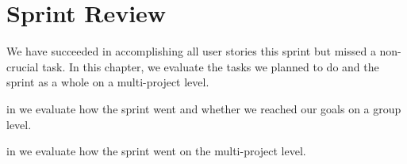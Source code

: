 \chapter{Sprint Review}\label{chap:sprint3_end}
We have succeeded in accomplishing all user stories this sprint but missed a non-crucial task. In this chapter, we evaluate the tasks we planned to do and the sprint as a whole on a multi-project level.

\begin{chapterorganization}
  \item in  we evaluate how the sprint went and whether we reached our goals on a group level.
  \item in  we evaluate how the sprint went on the multi-project level.
\end{chapterorganization}

